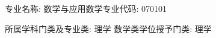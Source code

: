\documentclass[border=0pt]{standalone}
\begin{document}
\begin{minipage}{146.5mm}\fontsize{10}{13}\selectfont
\noindent 专业名称: 数学与应用数学\hfill 专业代码: 070101\par
\noindent 所属学科门类及专业类: 理学 数学类\hfill 学位授予门类: 理学\par
\end{minipage}
\end{document}

